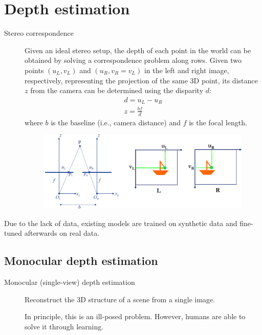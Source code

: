 \chapter{Depth estimation}


\begin{description}
    \item[Stereo correspondence] 
        Given an ideal stereo setup, the depth of each point in the world can be obtained by solving a correspondence problem along rows. Given two points $(u_L, v_L)$ and $(u_R, v_R=v_L)$ in the left and right image, respectively, representing the projection of the same 3D point, its distance $z$ from the camera can be determined using the disparity $d$:
        \[
            \begin{gathered}
                d = u_L - u_R \\
                z = \frac{bf}{d}
            \end{gathered}
        \]
        where $b$ is the baseline (i.e., camera distance) and $f$ is the focal length.

        \begin{figure}[H]
            \centering
            \includegraphics[width=0.65\linewidth]{./img/stereo_correspondence.png}
        \end{figure}
\end{description}

\begin{remark}
    Due to the lack of data, existing models are trained on synthetic data and fine-tuned afterwards on real data.
\end{remark}



\section{Monocular depth estimation}

\begin{description}
    \item[Monocular (single-view) depth estimation] 
        Reconstruct the 3D structure of a scene from a single image.

        \begin{remark}
            In principle, this is an ill-posed problem. However, humans are able to solve it through learning.
        \end{remark}
\end{description}


